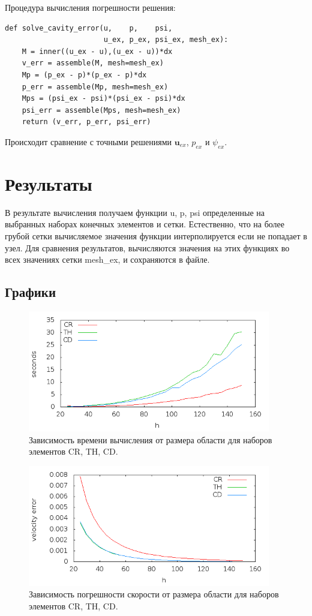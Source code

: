 \documentclass[12pt]{article}
\begin{document}
Процедура вычисления погрешности решения:
\begin{lstlisting}
def solve_cavity_error(u,    p,    psi,    
                       u_ex, p_ex, psi_ex, mesh_ex):
    M = inner((u_ex - u),(u_ex - u))*dx
    v_err = assemble(M, mesh=mesh_ex)    
    Mp = (p_ex - p)*(p_ex - p)*dx
    p_err = assemble(Mp, mesh=mesh_ex)
    Mps = (psi_ex - psi)*(psi_ex - psi)*dx
    psi_err = assemble(Mps, mesh=mesh_ex)
    return (v_err, p_err, psi_err)
\end{lstlisting}
Происходит сравнение с точными решениями ${\bm u_{ex}}$, $p_{ex}$ и $\psi_{ex}$.

\section{Результаты}
В результате вычисления получаем функции u, p, psi определенные на выбранных наборах конечных элементов и сетки. Естественно, что на более грубой сетки вычисляемое значения функции интерполируется если не попадает в узел. Для сравнения результатов, вычисляются значения на этих функциях во всех значениях сетки mesh\_ex, и сохраняются в файле.

\subsection{Графики}
\begin{figure}
	\begin{center}
		\includegraphics[width=400px]{pics/time}
		\caption{Зависимость времени вычисления от размера области для наборов элементов CR, TH, CD.}
		\label{fg:time}
	\end{center}
\end{figure}

\begin{figure}
	\begin{center}
		\includegraphics[width=400px]{pics/u_err}
		\caption{Зависимость погрешности скорости от размера области для наборов элементов CR, TH, CD.}
		\label{fg:u_err}
	\end{center}
\end{figure}
\end{document}
